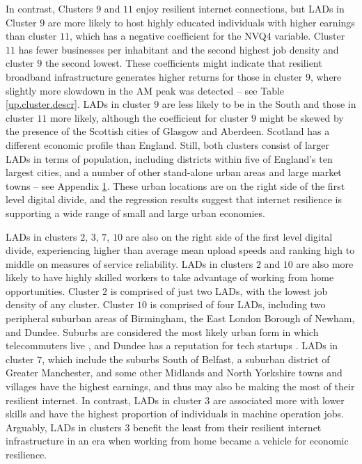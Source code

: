 \documentclass[]{interact}
\theoremstyle{plain}%
\theoremstyle{definition}
\theoremstyle{remark}
\begin{document}
In contrast, Clusters \(9\) and \(11\) enjoy resilient internet
connections, but LADs in Cluster \(9\) are more likely to host highly
educated individuals with higher earnings than cluster \(11\), which has
a negative coefficient for the NVQ4 variable. Cluster \(11\) has fewer
businesses per inhabitant and the second highest job density and cluster
\(9\) the second lowest. These coefficients might indicate that
resilient broadband infrastructure generates higher returns for those in
cluster \(9\), where slightly more slowdown in the AM peak was detected
-- see Table \ref{up.cluster.descr}. LADs in cluster \(9\) are less
likely to be in the South and those in cluster \(11\) more likely,
although the coefficient for cluster \(9\) might be skewed by the
presence of the Scottish cities of Glasgow and Aberdeen. Scotland has a
different economic profile than England. Still, both clusters consist of
larger LADs in terms of population, including districts within five of
England's ten largest cities, and a number of other stand-alone urban
areas and large market towns -- see Appendix
\protect\hyperlink{appendix1}{1}. These urban locations are on the right
side of the first level digital divide, and the regression results
suggest that internet resilience is supporting a wide range of small and
large urban economies.

LADs in clusters \(2\), \(3\), \(7\), \(10\) are also on the right side
of the first level digital divide, experiencing higher than average mean
upload speeds and ranking high to middle on measures of service
reliability. LADs in clusters \(2\) and \(10\) are also more likely to
have highly skilled workers to take advantage of working from home
opportunities. Cluster \(2\) is comprised of just two LADs, with the
lowest job density of any cluster. Cluster \(10\) is comprised of four
LADs, including two peripheral suburban areas of Birmingham, the East
London Borough of Newham, and Dundee. Suburbs are considered the most
likely urban form in which telecommuters live \citep{e2018does}, and
Dundee has a reputation for tech startups \citep{technation2017}. LADs
in cluster \(7\), which include the suburbs South of Belfast, a suburban
district of Greater Manchester, and some other Midlands and North
Yorkshire towns and villages have the highest earnings, and thus may
also be making the most of their resilient internet. In contrast, LADs
in cluster \(3\) are associated more with lower skills and have the
highest proportion of individuals in machine operation jobs. Arguably,
LADs in clusters \(3\) benefit the least from their resilient internet
infrastructure in an era when working from home became a vehicle for
economic resilience.
\end{document}
